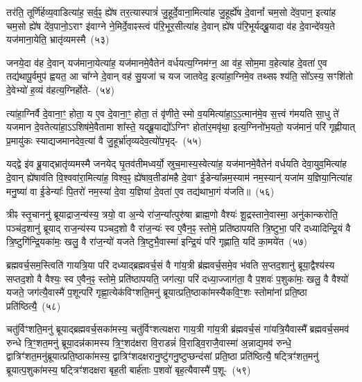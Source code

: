 तर॑ति॒ तूर्णि॑र्\mbox{}हव्य॒वाडित्या॑ह॒ सर्व॒ꣴ॒ ह्ये॑ष तर॒त्यास्पात्रं॑ जु॒हूर्दे॒वा\-ना॒\-मि\-त्या॑ह जु॒हूर्\mbox{}ह्ये॑ष दे॒वानां᳚ चम॒सो दे॑व॒पान॒ इत्या॑ह चम॒सो ह्ये॑ष दे॑व॒पानो॒\-ऽराꣳ इ॑वाग्ने ने॒मिर्दे॒वाꣴस्त्वं प॑रि॒भूर॒सीत्या॑ह दे॒वान् ह्ये॑ष प॑रि॒\-भूर्यद्ब्रू॒\-यादा व॑ह दे॒वान्दे॑वय॒ते यज॑माना॒येति॒ भ्रातृ॑व्यमस्मै~(५३)

जनये॒दा व॑ह दे॒वान् यज॑माना॒येत्या॑ह॒ यज॑मानमे॒वैतेन॑ वर्ध\-य\-त्य॒\-ग्नि\-म॑ग्न॒ आ व॑ह॒ सोम॒मा व॒हेत्या॑ह दे॒वता॑ ए॒व तद्य॑थापू॒र्वमुप॑ ह्वयत॒ आ चा᳚ग्ने दे॒वान् वह॑ सु॒यजा॑ च यज जातवेद॒ इत्या॑हा॒ग्निमे॒व तथ्सꣴ श्य॑ति॒ सो᳚\-ऽस्य॒ सꣳशि॑तो दे॒वेभ्यो॑ ह॒व्यं व॑हत्य॒ग्निर्\mbox{}होते-~(५४)

त्या॑हा॒ग्निर्वै दे॒वाना॒ꣳ॒ होता॒ य ए॒व दे॒वाना॒ꣳ॒ होता॒ तं वृ॑णीते॒ स्मो व॒यमित्या॑हा॒ऽ॒ऽ॒त्मान॑मे॒व स॒त्त्वं ग॑मयति सा॒धु ते॑ यजमान दे॒वतेत्या॑हा॒ऽऽशिष॑मे॒वैतामा शा᳚स्ते॒ यद्ब्रू॒याद्यो᳚\-ऽग्निꣳ होता॑र॒मवृ॑था॒ इत्य॒ग्निनो॑भ॒यतो॒ यज॑मानं॒ परि॑ गृह्णीयात् प्र॒मायु॑कः स्याद्यजमानदेव॒त्या॑ वै जु॒हूर्भ्रा॑तृव्यदेव॒त्यो॑प॒भृद्-~(५५)

यद्द्वे इ॑व ब्रू॒याद्भ्रातृ॑व्यमस्मै जनयेद् घृ॒तव॑तीमध्वर्यो॒ स्रुच॒मास्य॒\-स्वे\-त्या॑ह॒ यज॑मानमे॒वैतेन॑ वर्धयति देवा॒युव॒मित्या॑ह दे॒वान् ह्ये॑षा\-व॑ति वि॒श्व\-वा॑रा॒मित्या॑ह॒ विश्व॒ꣴ॒ ह्ये॑षाव॒तीडा॑महै दे॒वाꣳ ई॒डेन्या᳚न्नम॒स्याम॑ नम॒स्यान्॑ यजा॑म य॒ज्ञिया॒नित्या॑ह मनु॒ष्या॑ वा ई॒डेन्याः᳚ पि॒तरो॑ नम॒स्या॑ दे॒वा य॒ज्ञिया॑ दे॒वता॑ ए॒व तद्य॑थाभा॒गं य॑जति॥~(५६)

{\anuvakamend[{विप्रा॑नुमदित॒ इत्या॑ह च॒नास्मै॒ होतो॑प॒भृद्दे॒वता॑ ए॒व त्रीणि॑ च}]}%

त्रीꣴ स्तृ॒चाननु॑ ब्रूयाद्राज॒न्य॑स्य॒ त्रयो॒ वा अ॒न्ये रा॑ज॒न्या᳚त्पुरु॑षा ब्राह्म॒णो वैश्यः॑ शू॒द्रस्ताने॒वास्मा॒ अनु॑कान्करोति॒ पञ्च॑द॒शानु॑ ब्रूयाद् राज॒न्य॑स्य पञ्चद॒शो वै रा॑ज॒न्यः॑ स्व ए॒वैन॒ꣴ॒ स्तोमे॒ प्रति॑\-ष्ठापयति त्रि॒ष्टुभा॒ परि॑ दध्यादिन्द्रि॒यं वै त्रि॒ष्टुगि॑न्द्रि॒यका॑मः॒ खलु॒ वै रा॑ज॒न्यो॑ यजते त्रि॒ष्टुभै॒वास्मा॑ इन्द्रि॒यं परि॑ गृह्णाति॒ यदि॑ का॒मये॑त~(५७)

ब्रह्मवर्च॒सम॒स्त्विति॑ गायत्रि॒या परि॑ दध्याद्ब्रह्मवर्च॒सं वै गा॑य॒त्री ब्र॑ह्मवर्च॒समे॒व भ॑वति स॒प्तद॒शानु॑ ब्रूया॒द्वैश्य॑स्य सप्तद॒शो वै वैश्यः॒ स्व ए॒वैन॒ꣴ॒ स्तोमे॒ प्रति॑\-ष्ठापयति॒ जग॑त्या॒ परि॑ दध्या॒ज्जाग॑ता॒ वै प॒शवः॑ प॒शुका॑मः॒ खलु॒ वै वैश्यो॑ यजते॒ जग॑त्यै॒वास्मै॑ प॒शून्परि॑ गृह्णा॒त्येक॑विꣳशति॒मनु॑ ब्रूयात्प्रति॒ष्ठाका॑मस्यैकवि॒ꣳ॒शः स्तोमा॑नां प्रति॒ष्ठा प्रति॑ष्ठित्यै॒~(५८)

चतु॑र्विꣳशति॒मनु॑ ब्रूयाद्ब्रह्मवर्च॒सका॑मस्य॒ चतु॑र्विꣳशत्यक्षरा गाय॒त्री गा॑य॒त्री ब्र॑ह्मवर्च॒सं गा॑यत्रि॒यैवास्मै᳚ ब्रह्मवर्च॒समव॑ रुन्धे त्रि॒ꣳ॒शत॒\-मनु॑ ब्रूया॒दन्न॑कामस्य त्रि॒ꣳ॒शद॑क्षरा वि॒राडन्नं॑ वि॒राड्वि॒रा\-जै॒\-वा\-स्मा॑ अ॒न्नाद्\-य॒\-मव॑ रुन्धे॒ द्वात्रिꣳ॑शत॒\-मनु॑\-ब्रूयात्प्र\-ति॒ष्ठा\-का॑मस्य॒ द्वात्रिꣳ॑शद\-क्षरा\-नु॒ष्टु॑ग\-नु॒ष्टुप्छन्द॑सां प्रति॒ष्ठा प्रति॑ष्ठित्यै॒ षट्त्रिꣳ॑शत॒मनु॑ ब्रूयात्प॒शुका॑मस्य॒ षट्त्रिꣳ॑शदक्षरा बृह॒ती बार्\mbox{}ह॑ताः प॒शवो॑ बृह॒त्यैवास्मै॑ प॒शू-~(५९)

